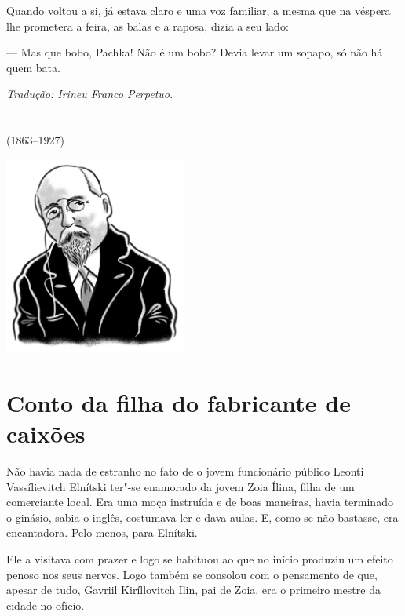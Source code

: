 Quando voltou a si, já estava claro e uma voz familiar, a mesma que na
véspera lhe prometera a feira, as balas e a raposa, dizia a seu lado:

--- Mas que bobo, Pachka! Não é um bobo? Devia levar um sopapo, só não
há quem bata.

\medskip

{\footnotesize\hfill\emph{Tradução: Irineu Franco Perpetuo.}}

\chapter*{}
\label{part8}
\thispagestyle{empty}

\begin{vplace}[1.5]
{\HUGES\hfill{}}

{\LARGE\hfill\textlt(1863–1927)}
\end{vplace}

\pagebreak
\thispagestyle{empty}
\mbox{}
\vfill
\begin{center}
\includegraphics[width=6cm]{./imgs/autor7.jpg}
\end{center}


\chapter{Conto da filha do fabricante de caixões}

Não havia nada de estranho no fato de o jovem funcionário público Leonti
Vassílievitch Elnítski ter"-se enamorado da jovem Zoia Ílina, filha de um
comerciante local. Era uma moça instruída e de boas maneiras, havia
terminado o ginásio, sabia o inglês, costumava ler e dava aulas. E, como
se não bastasse, era encantadora. Pelo menos, para Elnítski.

Ele a visitava com prazer e logo se habituou ao que no início produziu
um efeito penoso nos seus nervos. Logo também se consolou com o
pensamento de que, apesar de tudo, Gavriil Kiríllovitch Ilin, pai de
Zoia, era o primeiro mestre da cidade no ofício.

